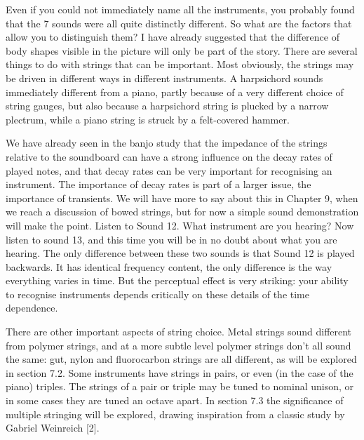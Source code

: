 
  Even if you could not immediately name all the instruments, you probably 
  found that the 7 sounds were all quite distinctly different. So what are the 
  factors that allow you to distinguish them? I have already suggested that the 
  difference of body shapes visible in the picture will only be part of the 
  story. There are several things to do with strings that can be important. 
  Most obviously, the strings may be driven in different ways in different 
  instruments. A harpsichord sounds immediately different from a piano, partly 
  because of a very different choice of string gauges, but also because a 
  harpsichord string is plucked by a narrow plectrum, while a piano string is 
  struck by a felt-covered hammer. 

  We have already seen in the banjo study that the impedance of the strings 
  relative to the soundboard can have a strong influence on the decay rates of 
  played notes, and that decay rates can be very important for recognising an 
  instrument. The importance of decay rates is part of a larger issue, the 
  importance of transients. We will have more to say about this in Chapter 9, 
  when we reach a discussion of bowed strings, but for now a simple sound 
  demonstration will make the point. Listen to Sound 12. What instrument are 
  you hearing? Now listen to sound 13, and this time you will be in no doubt 
  about what you are hearing. The only difference between these two sounds is 
  that Sound 12 is played backwards. It has identical frequency content, the 
  only difference is the way everything varies in time. But the perceptual 
  effect is very striking: your ability to recognise instruments depends 
  critically on these details of the time dependence. 



  There are other important aspects of string choice. Metal strings sound 
  different from polymer strings, and at a more subtle level polymer strings 
  don’t all sound the same: gut, nylon and fluorocarbon strings are all 
  different, as will be explored in section 7.2. Some instruments have strings 
  in pairs, or even (in the case of the piano) triples. The strings of a pair 
  or triple may be tuned to nominal unison, or in some cases they are tuned an 
  octave apart. In section 7.3 the significance of multiple stringing will be 
  explored, drawing inspiration from a classic study by Gabriel Weinreich [2]. 

